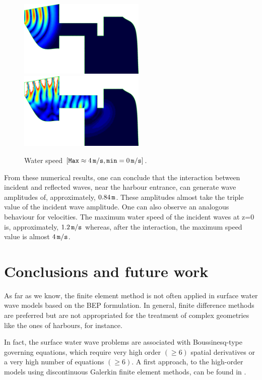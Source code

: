 \begin{figure}[!htb]
{\centering
\includegraphics[width=6cm]{chapters/lopes/eps/vel1.eps}
\includegraphics[width=6cm]{chapters/lopes/eps/vel2.eps}
\caption{Water speed
\([{\tt Max}\approx 4\, {\tt m/s}, {\tt min}=0\,{\tt m/s}]\).}\label{fig::vel1}\par}
\end{figure}

From these numerical results, one can conclude that the
interaction between incident and reflected waves, near the harbour entrance,
 can generate wave amplitudes of, approximately,
 \(0.84\,{\tt m}\). These amplitudes  almost  take the
 triple value  of the incident wave amplitude.
One can also observe an analogous behaviour for
velocities. The maximum water speed   of the
incident waves at z=0 
is, approximately, \( 1.2\,{\tt m}/{\tt s}\) whereas, after the
interaction, the maximum speed value is almost \(4\,{\tt
m}/{\tt s}\).    
       

\section{Conclusions and future work}

As far as we know,  the finite element 
method is not often applied in surface water wave models
based on the BEP formulation. 
In general, finite difference methods are preferred 
but are not appropriated for the treatment of complex
geometries like the ones of  harbours, for instance. 

In fact, the surface water wave problems are associated with 
Boussinesq-type governing equations, which require very high order
\((\geq 6)\) spatial
derivatives or a very high number of equations \((\geq 6)\). 
A first approach, to the high-order  models  using
discontinuous Galerkin finite element methods, can be found
in \cite{KarAll06}.

